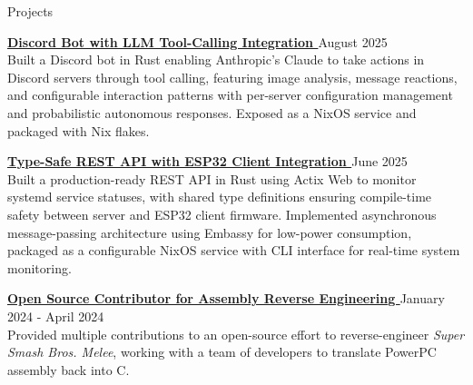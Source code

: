 \documentclass{resume}
\newcommand{\scaledfaExternalLink}{\raisebox{0.1\height}{\scalebox{0.7}{\faExternalLink*}}}
\begin{document}
\begin{rSection}{Projects}

\item{} {\bf{}
    \href{https://github.com/wyatt-avilla/claude-discord-bot}{Discord
  Bot with LLM Tool-Calling Integration \scaledfaExternalLink}}
  {\hfill{} August 2025} \\
  Built a Discord bot in Rust enabling Anthropic's Claude to take
  actions in Discord servers through tool calling, featuring image
  analysis, message reactions, and configurable interaction patterns
  with per-server configuration management and probabilistic
  autonomous responses. Exposed as a NixOS service and packaged with Nix flakes.

\item{} {\bf{} \href{https://github.com/wyatt-avilla/hypha}{Type-Safe
  REST API with ESP32 Client Integration \scaledfaExternalLink}}
  {\hfill{} June 2025} \\
  Built a production-ready REST API in Rust using Actix Web to
  monitor systemd service statuses, with shared type definitions
  ensuring compile-time safety between server and ESP32 client
  firmware. Implemented asynchronous message-passing architecture
  using Embassy for low-power consumption, packaged as a configurable
  NixOS service with CLI interface for real-time system monitoring.

\item{} {\bf{}
    \href{https://github.com/search?q=repo\%3Adoldecomp\%2Fmelee++author\%3Awyatt-avilla&type=pullrequests&ref=advsearch}{Open
      Source Contributor for
  Assembly Reverse Engineering \scaledfaExternalLink}} {\hfill{}
  January 2024 - April 2024} \\
  Provided multiple contributions to an open-source effort to reverse-engineer
  \textit{Super Smash Bros. Melee}, working with a team of developers
  to translate PowerPC
  assembly back into C.

\end{rSection}
\end{document}
